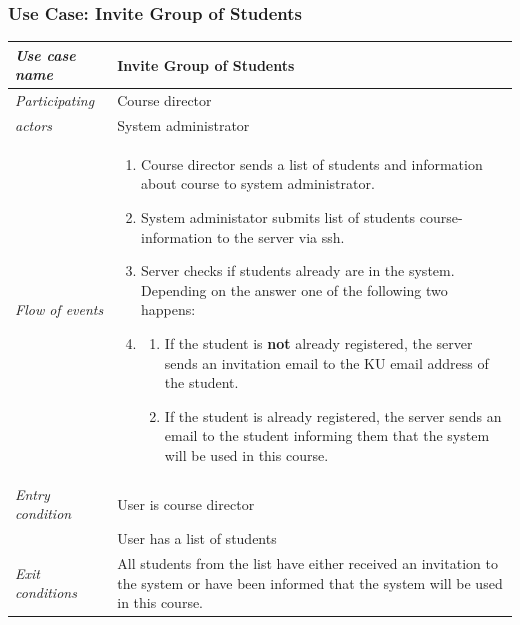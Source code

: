 \documentclass[11pt,a4paper]{report}
\begin{document}
\subsubsection{Use Case: Invite Group of Students}
\begin{tabular}{l p{}}
    \toprule
    \textit{Use case name} & Invite Group of Students\\
    \midrule
    \textit{Participating} & Course director \\
    \textit{actors} & System administrator \\
    \midrule
    \textit{Flow of events} &
    \vspace{-6.7mm} \begin{enumerate}
        \item Course director sends a list of students and information about course to system administrator.
        \item System administator submits list of students course-information to the server via ssh.
        \item Server checks if students already are in the system. Depending on the answer one of the following two happens:
        \item
        \begin{enumerate}
            \item If the student is \textbf{not} already registered, the server sends an invitation email to the KU email address of the student.
            \item If the student is already registered, the server sends an email to the student informing them that the system will be used in this course.
        \end{enumerate}
    \end{enumerate}
    \\
    \midrule
    \textit{Entry condition} & User is course director \\
                             & User has a list of students \\
    \midrule
    \textit{Exit conditions} & All students from the list have either received an invitation to the system or have been informed that the system will be used in this course. \\
    \bottomrule
\end{tabular}
\end{document}
